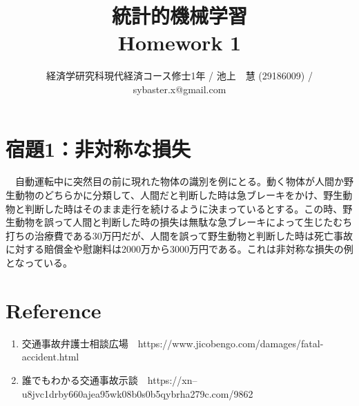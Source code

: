 \documentclass{article}
\begin{document}
\title{統計的機械学習 \\ 
Homework 1}
\author{経済学研究科現代経済コース修士1年 / 池上　慧 (29186009) / sybaster.x@gmail.com}
\maketitle

\section{宿題1：非対称な損失}
　自動運転中に突然目の前に現れた物体の識別を例にとる。動く物体が人間か野生動物のどちらかに分類して、人間だと判断した時は急ブレーキをかけ、野生動物と判断した時はそのまま走行を続けるように決まっているとする。この時、野生動物を誤って人間と判断した時の損失は無駄な急ブレーキによって生じたむち打ちの治療費である30万円だが、人間を誤って野生動物と判断した時は死亡事故に対する賠償金や慰謝料は2000万から3000万円である。これは非対称な損失の例となっている。

\section{Reference}
\begin{enumerate}
	\item 交通事故弁護士相談広場　https://www.jicobengo.com/damages/fatal-accident.html
	\item 誰でもわかる交通事故示談　https://xn--u8jvc1drby660ajea95wk08b0s0b5qybrha279c.com/9862
\end{enumerate}
\end{document}
